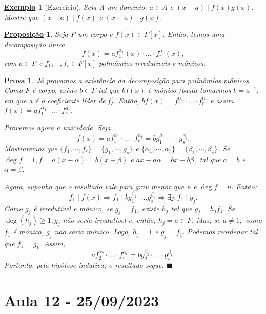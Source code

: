 \documentclass{article}
\newtheorem*{prop*}{\underline{Proposi\c c\~ao}}
\newtheorem{example}{\underline{Exemplo}}
\newtheorem*{proof*}{\underline{Prova}}
\renewcommand\qedsymbol{$\blacksquare$}
\begin{document}
    \begin{example}[Exercício]
      Seja A um domínio, \(a\in A\) e \((x-a)\mid f(x)g(x).\) Mostre que \((x-a)\mid f(x)\) e \((x-a)\mid g(x).\) 
    \end{example}
    \begin{prop*}
      Seja F um corpo e \(f(x)\in F[x]\). Então, temos uma decomposição única 
      \[
        f(x) = af_{1}^{\alpha_{1}}(x)\cdot \dotsc \cdot f_{r}^{\alpha_{r}}(x),
      \]
      com \(a\in F\) e \(f_{1}, \cdots, f_{r}\in F[x]\) polinômios irredutíveis e mônicos.
    \end{prop*}
    \begin{proof*}
      Já provamos a existência da decomposição para polinômios mônicos. Como F é corpo, existe \(b\in F\) tal que 
      \(bf(x)\) é mônico (basta tomarmos \(b=a^{-1},\) em que a é o coeficiente líder de f). Então, \(bf(x) = f_{1}^{\alpha_{1}}\cdot \dotsc \cdot f_{r}^{\alpha_{r}}\)
      e assim \(f(x) =af_{1}^{\alpha_{1}}\cdot \dotsc \cdot f_{r}^{\alpha_{r}}.\)

      Provemos agora a unicidade. Seja 
      \[
        f(x)=af_{1}^{\alpha_{1}} \cdot \dotsc \cdot f_{r}^{\alpha_{r}} = bg_{1}^{\beta_{1}} \cdot \cdots \cdot g_{s}^{\beta_{s}}.
      \]
      Mostraremos que \(\{f_{1}, \cdots, f_{r}\} = \{g_{1}, \cdots, g_{s}\}\) e \(\{\alpha_{1}, \cdots, \alpha_{r}\} = \{\beta_{1}, \cdots, \beta_{s}\}\).
      Se \(\deg{f} = 1, f = a(x-\alpha ) = b(x-\beta )\) e \(ax -a\alpha =bx - b\beta,\) tal que \(a=b\) e \(\alpha =\beta .\)

      Agora, suponha que o resultado vale para grau menor que n e \(\deg{f} = n.\) Então: 
      \[
        f_{1}\mid f(x) \Rightarrow f_{1}\mid bg_{1}^{\beta_{1}}\cdot \dotsc g_{s}^{\beta_{s}} \Rightarrow \exists j: f_{1}\mid g_{j}.
      \]
      Como \(g_{j}\) é irredutível e mônico, se \(g_{j}=f_{1}\), existe \(h_{j}\) tal que \(g_{j} = h_{j}f_{1}.\) Se \(\deg{(h_{j})}\geq 1, g_{j}\) não seria
      irredutível e, então, \(h_{j} = a\in F.\) Mas, se \(a\neq1,\) como \(f_{1}\) é mônico, \(g_{j}\) não seria mônico. Logo, \(h_{j} = 1\) e \(g_{j} = f_{1}.\) 
      Podemos reordenar tal que \(f_{1} = g_{1}. \) Assim, 
      \[
        af_{2}^{\alpha_{2}}\cdot \dotsc \cdot f_{r}^{\alpha_{r}} = bg_{2}^{\beta_{2}} \cdot \dotsc \cdot g_{s}^{\beta_{s}}.
      \]
      Portanto, pela hipótese indutiva, o resultado segue. \qedsymbol
    \end{proof*}
    \newpage

    \section{Aula 12 - 25/09/2023}
\end{document}
